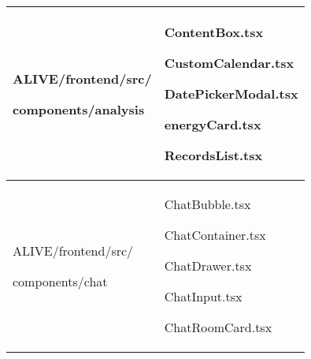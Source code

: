 \documentclass[conference]{IEEEtran}
\begin{document}
\begin{table}[h]
\begin{tabular}{|p{3.7cm}|p{4.1cm}|}
          ALIVE/frontend/src/ \par components/analysis \par  & ContentBox.tsx \par CustomCalendar.tsx \par DatePickerModal.tsx \par energyCard.tsx \par RecordsList.tsx
          \\ \hline
          
          ALIVE/frontend/src/ \par components/chat \par  & ChatBubble.tsx \par ChatContainer.tsx \par ChatDrawer.tsx \par ChatInput.tsx \par ChatRoomCard.tsx
          \\ \hline

    \end{tabular}
\end{table}
\end{document}
